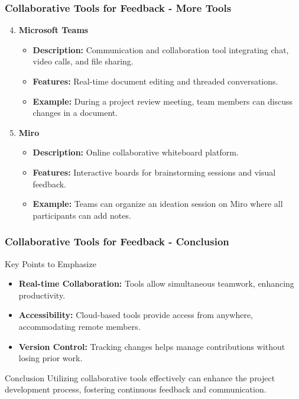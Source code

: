 \documentclass[aspectratio=169]{beamer}
\begin{document}
\begin{frame}[fragile]
    \frametitle{Collaborative Tools for Feedback - More Tools}
    \begin{enumerate}
        \setcounter{enumi}{3} %
        \item \textbf{Microsoft Teams}
            \begin{itemize}
                \item \textbf{Description:} Communication and collaboration tool integrating chat, video calls, and file sharing.
                \item \textbf{Features:} Real-time document editing and threaded conversations.
                \item \textbf{Example:} During a project review meeting, team members can discuss changes in a document.
            \end{itemize}
        
        \item \textbf{Miro}
            \begin{itemize}
                \item \textbf{Description:} Online collaborative whiteboard platform.
                \item \textbf{Features:} Interactive boards for brainstorming sessions and visual feedback.
                \item \textbf{Example:} Teams can organize an ideation session on Miro where all participants can add notes.
            \end{itemize}
    \end{enumerate}
\end{frame}

\begin{frame}[fragile]
    \frametitle{Collaborative Tools for Feedback - Conclusion}
    \begin{block}{Key Points to Emphasize}
        \begin{itemize}
            \item \textbf{Real-time Collaboration:} Tools allow simultaneous teamwork, enhancing productivity.
            \item \textbf{Accessibility:} Cloud-based tools provide access from anywhere, accommodating remote members.
            \item \textbf{Version Control:} Tracking changes helps manage contributions without losing prior work.
        \end{itemize}
    \end{block}
    
    \begin{block}{Conclusion}
        Utilizing collaborative tools effectively can enhance the project development process, fostering continuous feedback and communication.
    \end{block}
\end{frame}
\end{document}
